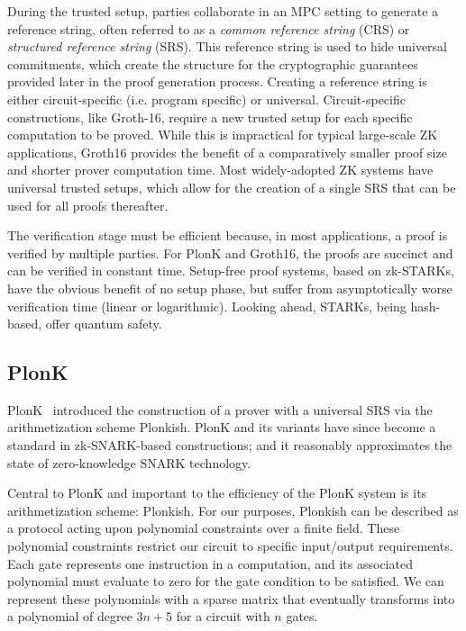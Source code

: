 \documentclass[sigconf]{acmart}
\begin{document}
During the trusted setup, parties collaborate in an MPC setting to generate a reference string, often referred to as a {\it common reference string} (CRS) or {\it structured reference string} (SRS). This reference string is used to hide universal commitments, which create the structure for the cryptographic guarantees provided later in the proof generation process. Creating a reference string is either circuit-specific (i.e. program specific) or universal. Circuit-specific constructions, like Groth-16, require a new trusted setup for each specific computation to be proved. While this is impractical for typical large-scale ZK applications, Groth16 provides the benefit of a comparatively smaller proof size and shorter prover computation time. Most widely-adopted ZK systems have universal trusted setups, which allow for the creation of a single SRS that can be used for all proofs thereafter. 

The verification stage must be efficient because, in most applications, a proof is verified by multiple parties. For PlonK and Groth16, the proofs are succinct and can be verified in constant time. 
Setup-free proof systems, based on zk-STARKs\cite{STARKS18}, have the obvious benefit of no setup phase, but suffer from asymptotically worse verification time (linear or logarithmic).
Looking ahead, STARKs, being hash-based, offer quantum safety.

\subsection{PlonK}
PlonK~\cite{Gabizon2019PlonKPO} introduced the construction of a prover with a universal SRS via the arithmetization scheme Plonkish. PlonK and its variants have since become a standard in zk-SNARK-based constructions; and it reasonably approximates the state of zero-knowledge SNARK technology. 

Central to PlonK and important to the efficiency of the PlonK system is its arithmetization scheme: Plonkish. For our purposes, Plonkish can be described as a protocol acting upon polynomial constraints over a finite field. These polynomial constraints restrict our circuit to specific input/output requirements. Each gate represents one instruction in a computation, and its associated polynomial must evaluate to zero for the gate condition to be satisfied. We can represent these polynomials with a sparse matrix that eventually transforms into a polynomial of degree $3n + 5$ for a circuit with $n$ gates.
\end{document}
